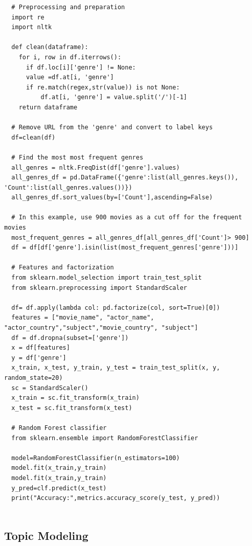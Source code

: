\begin{lstlisting}
  # Preprocessing and preparation
  import re
  import nltk
  
  def clean(dataframe):
    for i, row in df.iterrows():
      if df.loc[i]['genre'] != None:
      value =df.at[i, 'genre']
      if re.match(regex,str(value)) is not None:
          df.at[i, 'genre'] = value.split('/')[-1]
    return dataframe

  # Remove URL from the 'genre' and convert to label keys
  df=clean(df)

  # Find the most most frequent genres
  all_genres = nltk.FreqDist(df['genre'].values)
  all_genres_df = pd.DataFrame({'genre':list(all_genres.keys()), 'Count':list(all_genres.values())})
  all_genres_df.sort_values(by=['Count'],ascending=False)
  
  # In this example, use 900 movies as a cut off for the frequent movies
  most_frequent_genres = all_genres_df[all_genres_df['Count']> 900]
  df = df[df['genre'].isin(list(most_frequent_genres['genre']))]

  # Features and factorization
  from sklearn.model_selection import train_test_split
  from sklearn.preprocessing import StandardScaler

  df= df.apply(lambda col: pd.factorize(col, sort=True)[0])
  features = ["movie_name", "actor_name", "actor_country","subject","movie_country", "subject"]
  df = df.dropna(subset=['genre'])
  x = df[features]
  y = df['genre']
  x_train, x_test, y_train, y_test = train_test_split(x, y, random_state=20)
  sc = StandardScaler()
  x_train = sc.fit_transform(x_train)
  x_test = sc.fit_transform(x_test)

  # Random Forest classifier
  from sklearn.ensemble import RandomForestClassifier

  model=RandomForestClassifier(n_estimators=100)
  model.fit(x_train,y_train)
  model.fit(x_train,y_train)
  y_pred=clf.predict(x_test)
  print("Accuracy:",metrics.accuracy_score(y_test, y_pred))
    
\end{lstlisting}
 \pagebreak
\subsection{Topic Modeling}
\label{app:topiccase}

